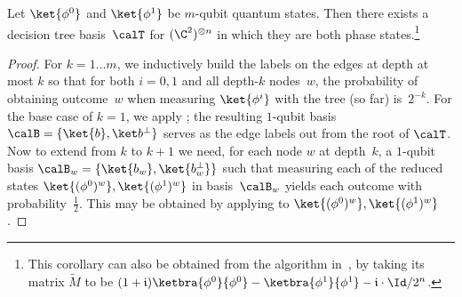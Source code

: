 \begin{corollary} \label{cor:perpy}
     Let $\ket{\phi^0}$ and $\ket{\phi^1}$ be $m$-qubit quantum states. Then there exists a decision tree basis~$\calT$ for $(\C^2)^{\otimes n}$ in which they are both phase states.\footnote{This corollary can also be obtained from the algorithm in~\cite[Sec.~III]{zhou2020saturating}, by taking its matrix $\tilde{M}$ to be $(1+\mathfrak{i})\ketbra{\phi^0}{\phi^0} - \ketbra{\phi^1}{\phi^1} - \mathfrak{i} \cdot \Id/2^n$.}
\end{corollary}
\begin{proof}
    For $k = 1 \dots m$, we inductively build the labels on the edges at depth at most $k$ so that for both $i = 0, 1$ and all depth-$k$ nodes~$w$, the probability of obtaining outcome~$w$ when measuring $\ket{\phi^i}$ with the tree (so far) is~$2^{-k}$.
    For the base case of $k = 1$, we apply ; the resulting $1$-qubit basis $\calB = \{\ket{b}, \ketbb\}$ serves as the edge labels out from the root of $\calT$.
    Now to extend from $k$ to $k+1$ we need, for each node $w$ at depth~$k$, a $1$-qubit basis $\calB_w = \{\ket{b_w}, \ket{b_w^\bot}\}$ such that measuring each of the reduced states $\ket{(\phi^0)^{w}}, \ket{(\phi^1)^{w}}$ in basis~$\calB_w$ yields each outcome with probability~$\frac12$. This may be obtained by applying  to $\ket{(\phi^0)^{w}}, \ket{(\phi^1)^{w}}$.


\end{proof}
